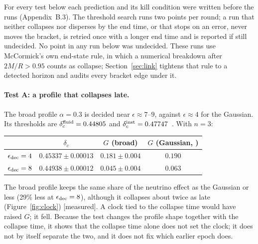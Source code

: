 \documentclass[11pt]{article}
\newcommand{\grade}[1]{\textsf{\small[#1]}}
\begin{document}
For every test below each prediction and its kill condition were written before the runs (Appendix~B.3). The threshold search runs two points per round; a run that neither collapses nor disperses by the end time, or that stops on an error, never moves the bracket, is retried once with a longer end time and is reported if still undecided. No point in any run below was undecided. These runs use McCormick's own end-state rule, in which a numerical breakdown after $2M/R>0.95$ counts as collapse; Section~\ref{sec:link} tightens that rule to a detected horizon and audits every bracket edge under it.

\paragraph{Test A: a profile that collapses late.} The broad profile $\alpha=0.3$ is decided near $\epsilon\approx7$--$9$, against $\epsilon\approx4$ for the Gaussian. Its thresholds are $\delta_c^{\rm fluid}=0.44805$ and $\delta_c^{\rm inst}=0.47747$~\cite{McCcode}. With $n=3$:
\begin{center}\begin{tabular}{lccc}\toprule
& $\delta_c$ & $G$ (broad) & $G$ (Gaussian, \cite{McC}) \\\midrule
$\epsilon_{\rm dec}=4$ & $0.45337\pm0.00013$ & $0.181\pm0.004$ & $0.190$\\
$\epsilon_{\rm dec}=8$ & $0.44938\pm0.00012$ & $0.045\pm0.004$ & $0.063$\\\bottomrule\end{tabular}\end{center}
The broad profile keeps the same share of the neutrino effect as the Gaussian or less (29\% less at $\epsilon_{\rm dec}=8$), although it collapses about twice as late (Figure~\ref{fig:clock}) \grade{measured}. A clock tied to the collapse time would have raised $G$; it fell. Because the test changes the profile shape together with the collapse time, it shows that the collapse time alone does not set the clock; it does not by itself separate the two, and it does not fix which earlier epoch does.
\end{document}
